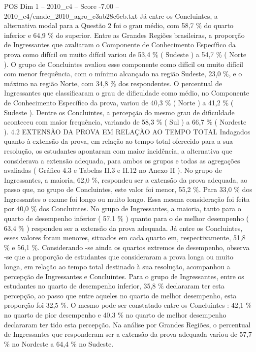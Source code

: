 \begin{textsample}{POS Dim 1 – 2010\_c4 – Score -7.00 – 2010\_c4/enade\_2010\_agro\_c3ab28c6eb.txt}
Já entre os Concluintes, a alternativa modal para a Questão 2 foi o grau médio, com 58,7 \% do quarto inferior e 64,9 \% do superior.
Entre as Grandes Regiões brasileiras, a proporção de Ingressantes que avaliaram o Componente de Conhecimento Específico da prova como difícil ou muito difícil variou de 53,4 \% ( Sudeste ) a 54,7 \% ( Norte ).
O grupo de Concluintes avaliou esse componente como difícil ou muito difícil com menor frequência, com o mínimo alcançado na região Sudeste, 23,0 \%, e o máximo na região Norte, com 34,8 \% dos respondentes.
O percentual de Ingressantes que classificaram o grau de dificuldade como médio, no Componente de Conhecimento Específico da prova, variou de 40,3 \% ( Norte ) a 41,2 \% ( Sudeste ).
Dentre os Concluintes, a percepção do mesmo grau de dificuldade aconteceu com maior frequência, variando de 58,3 \% ( Sul ) a 66,7 \% ( Nordeste ). 4.2 EXTENSÃO DA PROVA EM RELAÇÃO AO TEMPO TOTAL Indagados quanto à extensão da prova, em relação ao tempo total oferecido para a sua resolução, os estudantes apontaram com maior incidência, a alternativa que considerava a extensão adequada, para ambos os grupos e todas as agregações avaliadas ( Gráfico 4.3 e Tabelas II.3 e II.12 no Anexo II ).
No grupo de Ingressantes, a maioria, 62,0 \%, respondeu ser a extensão da prova adequada, ao passo que, no grupo de Concluintes, este valor foi menor, 55,2 \%.
Para 33,0 \% dos Ingressantes o exame foi longo ou muito longo.
Essa mesma consideração foi feita por 40,0 \% dos Concluintes.
No grupo de Ingressantes, a maioria, tanto para o quarto de desempenho inferior ( 57,1 \% ) quanto para o de melhor desempenho ( 63,4 \% ) respondeu ser a extensão da prova adequada.
Já entre os Concluintes, esses valores foram menores, situados em cada quarto em, respectivamente, 51,8 \% e 56,1 \%.
Considerando -se ainda os quartos extremos de desempenho, observa -se que a proporção de estudantes que consideraram a prova longa ou muito longa, em relação ao tempo total destinado à sua resolução, acompanhou a percepção de Ingressantes e Concluintes.
Para o grupo de Ingressantes, entre os estudantes no quarto de desempenho inferior, 35,8 \% declararam ter esta percepção, ao passo que entre aqueles no quarto de melhor desempenho, esta proporção foi 32,5 \%.
O mesmo pode ser constatado entre os Concluintes : 42,1 \% no quarto de pior desempenho e 40,3 \% no quarto de melhor desempenho declararam ter tido esta percepção.
Na análise por Grandes Regiões, o percentual de Ingressantes que responderam ser a extensão da prova adequada variou de 57,7 \% no Nordeste a 64,4 \% no Sudeste.

\end{textsample}
